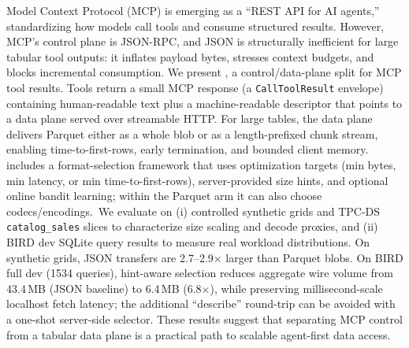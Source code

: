 Model Context Protocol (MCP) is emerging as a ``REST API for AI agents,'' standardizing how models call tools and consume structured results. However, MCP’s control plane is JSON-RPC, and JSON is structurally inefficient for large tabular tool outputs: it inflates payload bytes, stresses context budgets, and blocks incremental consumption. We present \system, a control/data-plane split for MCP tool results. Tools return a small MCP response (a \texttt{CallToolResult} envelope) containing human-readable text plus a machine-readable descriptor that points to a data plane served over streamable HTTP. For large tables, the data plane delivers Parquet either as a whole blob or as a length-prefixed chunk stream, enabling time-to-first-rows, early termination, and bounded client memory. \system includes a format-selection framework that uses optimization targets (min bytes, min latency, or min time-to-first-rows), server-provided size hints, and optional online bandit learning; within the Parquet arm it can also choose codecs/encodings.\ We evaluate on (i) controlled synthetic grids and TPC-DS \texttt{catalog\_sales} slices to characterize size scaling and decode proxies, and (ii) BIRD dev SQLite query results to measure real workload distributions. On synthetic grids, JSON transfers are 2.7--2.9$\times$ larger than Parquet blobs. On BIRD full dev (1534 queries), hint-aware selection reduces aggregate wire volume from 43.4\,MB (JSON baseline) to 6.4\,MB (6.8$\times$), while preserving millisecond-scale localhost fetch latency; the additional ``describe'' round-trip can be avoided with a one-shot server-side selector. These results suggest that separating MCP control from a tabular data plane is a practical path to scalable agent-first data access.